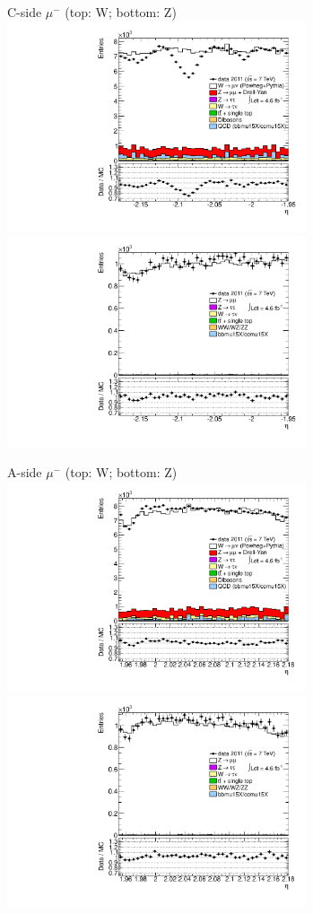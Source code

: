 {{
C-side $\mu^{-}$ (top: W; bottom: Z)
\centering
\includegraphics[width=0.66\textwidth]{dates/20130306/figures/etaphi/W_10_C_stack_l_eta_NEG} \\
\includegraphics[width=0.66\textwidth]{dates/20130306/figures/etaphi/Znowind_10_C_stack_lN_eta_ALL.pdf}

A-side $\mu^{-}$ (top: W; bottom: Z)
\centering
\includegraphics[width=0.66\textwidth]{dates/20130306/figures/etaphi/W_10_A_stack_l_eta_NEG} \\
\includegraphics[width=0.66\textwidth]{dates/20130306/figures/etaphi/Znowind_10_A_stack_lN_eta_ALL.pdf} 

}}
